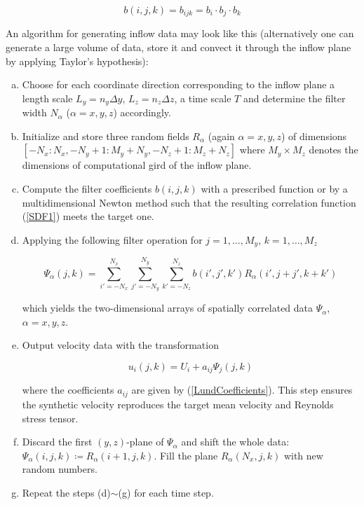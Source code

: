 \begin{equation}
b(i,j,k) = b_{ijk} = b_i \cdot b_j \cdot b_k
\end{equation}

\noindent An algorithm for generating inflow data may look like this (alternatively one can generate a large volume of data, store it and convect it through the inflow plane by applying Taylor's hypothesis):

\begin{enumerate}[(a)]

\item Choose for each coordinate direction corresponding to the inflow plane a length scale $L_y = n_y\varDelta y$, $L_z = n_z\varDelta z$, a time scale $T$ and determine the filter width $N_{\alpha}$ ($\alpha =x,y,z$) accordingly.

\item Initialize and store three random fields $R_{\alpha}$ (again $\alpha =x,y,z$) of dimensions $[-N_x:N_x,-N_y+1:M_y+N_y,-N_z+1:M_z+N_z]$ where $M_y \times M_z$ denotes the dimensions of computational gird of the inflow plane.

\item Compute the filter coefficients $b(i,j,k)$ with a prescribed function or by a multidimensional Newton method such that the resulting correlation function (\ref{SDF1}) meets the target one.

\item Applying the following filter operation for $j=1,\ldots,M_y$, $k=1,\ldots,M_z$

\begin{equation}
\Psi_{\alpha}(j,k) = \sum_{i'=-N_x}^{N_x}\sum_{j'=-N_y}^{N_y}\sum_{k'=-N_z}^{N_z}b(i',j',k')R_{\alpha}(i',j+j',k+k')
\end{equation}

\noindent which yields the two-dimensional arrays of spatially correlated data $\Psi_{\alpha}$, $\alpha =x,y,z$.

\item Output velocity data with the transformation

\begin{equation}
u_i(j,k) = U_i + a_{ij}\Psi_j(j,k)
\end{equation}

\noindent where the coefficients $a_{ij}$ are given by (\ref{LundCoefficients}). This step ensures the synthetic velocity reproduces the target mean velocity and Reynolds stress tensor.

\item Discard the first $(y,z)$-plane of $\Psi_{\alpha}$ and shift the whole data: $\Psi_{\alpha}(i,j,k)\coloneqq R_{\alpha}(i+1,j,k)$. Fill the plane $R_{\alpha}(N_x,j,k)$ with new random numbers.

\item Repeat the steps (d)$\sim$(g) for each time step.

\end{enumerate}

